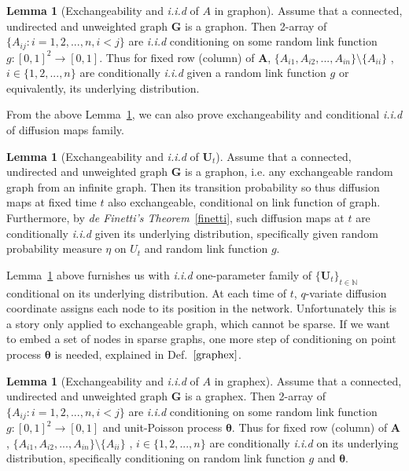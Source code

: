 \documentclass[12pt]{article}
\theoremstyle{definition}
\newtheorem{lemma}[theorem]{Lemma}
\begin{document}
\begin{lemma}[Exchangeability and \textit{i.i.d} of $A$ in graphon]
	\label{lemma_graphon}
Assume that a connected, undirected and unweighted graph $\mathbf{G}$ is a graphon. Then 2-array of $\{ A_{ij} : i = 1,2,... ,n , i < j \}$ are  \textit{i.i.d} conditioning on some random link function $g : [0,1]^2 \rightarrow [0,1]$. Thus for fixed row (column) of $\mathbf{A}$, $\{ A_{i1}, A_{i2}, ... , A_{in} \} \setminus \{ A_{ii} \} $ , $i \in \{ 1,2,... , n \}$ are conditionally \textit{i.i.d} given a random link function $g$ or equivalently, its underlying distribution.  
\end{lemma}
From the above Lemma~\ref{lemma_graphon}, we can also prove exchangeability and conditional \textit{i.i.d} of diffusion maps family. 
	
\begin{lemma}[Exchangeability and \textit{i.i.d} of $\mathbf{U}_{t}$]
\label{main_lemma}
	Assume that a connected, undirected and unweighted graph $\mathbf{G}$ is a graphon, i.e. any exchangeable random graph from an infinite graph. Then its transition probability so thus diffusion maps at fixed time $t$ also exchangeable, conditional on link function of graph. Furthermore, by \textit{de Finetti's Theorem}~\ref{finetti}, such diffusion maps at $t$ are conditionally \textit{i.i.d} given its underlying distribution, specifically given random probability measure $\eta$ on $U_{t}$ and random link function $g$.    
\end{lemma}
	
Lemma~\ref{main_lemma} above furnishes us with \textit{i.i.d} one-parameter family of $\{ \mathbf{U}_{t} \}_{t \in \mathbb{N}}$ conditional on its underlying distribution. At each time of $t$,  $q$-variate diffusion coordinate assigns each node to its position in the network. Unfortunately this is a story only applied to exchangeable graph, which cannot be sparse. If we want to embed a set of nodes in sparse graphs, one more step of conditioning on point process $\mathbf{\theta}$ is needed, explained in Def.~$\ref{graphex}$.  
	
\begin{lemma}[Exchangeability and \textit{i.i.d} of $A$ in graphex]
\label{lemma_graphex}
Assume that a connected, undirected and unweighted graph $\mathbf{G}$ is a graphex. Then 2-array of $\{ A_{ij} : i = 1,2,... ,n , i < j \}$ are  \textit{i.i.d} conditioning on some random link function $g : [0,1]^2 \rightarrow [0,1]$ and unit-Poisson process $\mathbf{\theta}$. Thus for fixed row (column) of $\mathbf{A}$, $\{ A_{i1}, A_{i2}, ... , A_{in} \} \setminus \{ A_{ii} \} $ , $i \in \{ 1,2,... , n \}$ are conditionally \textit{i.i.d} on its underlying distribution, specifically conditioning on random link function $g$ and $\mathbf{\theta}$.  
\end{lemma}	
\end{document}
